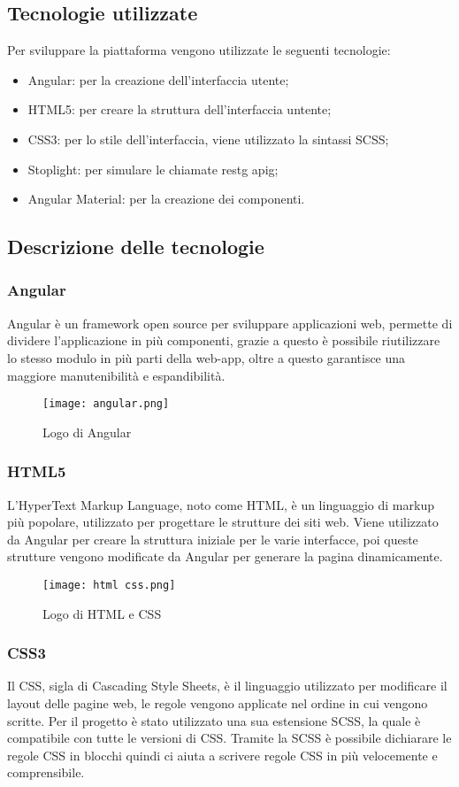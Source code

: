 \subsection{Tecnologie utilizzate}
Per sviluppare la piattaforma vengono utilizzate le seguenti tecnologie:
\begin{itemize}
    \item Angular: per la creazione dell'interfaccia utente;
    \item HTML5: per creare la struttura dell'interfaccia untente;
    \item CSS3: per lo stile dell'interfaccia, viene utilizzato la sintassi SCSS;
    \item Stoplight: per simulare le chiamate \gls{restg} \gls{apig};
    \item Angular Material: per la creazione dei componenti.
\end{itemize}
\subsection{Descrizione delle tecnologie}
\subsubsection{Angular}
Angular è un framework open source per sviluppare applicazioni web, permette di dividere l'applicazione in più componenti, grazie a questo è possibile riutilizzare lo stesso modulo in più parti della web-app, oltre a questo garantisce una maggiore manutenibilità e espandibilità.
\begin{figure}[H]
    \centering
    \texttt{[image: angular.png]}
    \caption{Logo di Angular}
\end{figure}
\subsubsection{HTML5}
L'HyperText Markup Language, noto come HTML, è un linguaggio di markup più popolare, utilizzato per progettare le strutture dei siti web. Viene utilizzato da Angular per creare la struttura iniziale per le varie interfacce, poi queste strutture vengono modificate da Angular per generare la pagina dinamicamente.
\begin{figure}[H]
    \centering
    \texttt{[image: html css.png]}
    \caption{Logo di HTML e CSS}
\end{figure}
\subsubsection{CSS3}
Il CSS, sigla di Cascading Style Sheets, è il linguaggio utilizzato per modificare il layout delle pagine web, le regole vengono applicate nel ordine in cui vengono scritte. Per il progetto è stato utilizzato una sua estensione SCSS, la quale è compatibile con tutte le versioni di CSS. Tramite la SCSS è possibile dichiarare le regole CSS in blocchi quindi ci aiuta a scrivere regole CSS in più velocemente e comprensibile.
